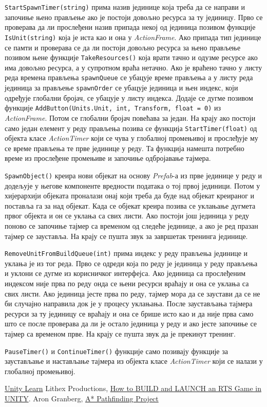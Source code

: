 \documentclass[11pt,a4paper]{article}
\begin{document}
\texttt{StartSpawnTimer(string)} прима назив јединице која треба да се направи и започиње њено прављење ако је постоји довољно ресурса за ту јединицу. Прво се проверава да ли прослеђени назив припада некој од јединица позивом функције \texttt{IsUnit(string)} која је иста као и она у \emph{ActionFrame}. Ако припада тип јединице се памти и проверава се да ли постоји довољно ресурса за њено прављење позивом њене функције \texttt{TakeResources()} која врати тачно и одузме ресурсе ако има довољно ресурса, а у супротном враћа нетачно. Ако је враћено тачно у листу реда времена прављења \texttt{spawnQueue} се убацује време прављења а у листу реда јединица за прављење \texttt{spawnOrder} се убацује јединица и њен индекс, који одређује глобални бројач, се убацује у листу индекса. Додаје се дугме позивом функције \texttt{AddButton(Units.Unit, int, Transform, float = 0)} из \emph{ActionFrame}. Потом се глобални бројач повећава за један. На крају ако постоји само један елемент у реду прављења позива се функција \texttt{StartTimer(float)} од објекта класе \emph{ActionTimer} који се чува у глобалној промењивој и прослеђује му се време прављења те прве јединице у реду. Та функција намешта потребно време из прослеђене промењиве и започиње одбројавање тајмера.

\texttt{SpawnObject()}  креира нови објекат на основу \emph{Prefab}-а из прве јединице у реду и додељује у његове компоненте вредности података о тој првој јединици. Потом у хијерархији објеката проналази онај који треба да буде над објекат креираног и поставља га за над објекат. Када се објекат креира позива се уклањање дугмета првог објекта и он се уклања са свих листи. Ако постоји још јединица у реду поново се започиње тајмер са временом од следеће јединице, а ако је ред празан тајмер се зауставља. На крају се пушта звук за завршетак тренинга јединице.

\texttt{RemoveUnitFromBuildQueue(int)} прима индекс у реду прављења јединице и уклања је из тог реда. Прво се одреди која по реду је јединица у реду прављења и уклони се дугме из корисничког интерфејса. Ако јединица са прослеђеним индексом није прва по реду онда се њени ресурси враћају и она се уклања са свих листи. Ако јединица јесте прва по реду, тајмер мора да се заустави да се не би случајно направила док је у процесу уклањања. После заустављања тајмера ресурси за ту јединицу се враћају и она се брише исто као и да није прва само што се после проверава да ли је остало јединица у реду и ако јесте започиње се тајмер са временом прве. На крају се пушта звук да је прекинут тренинг.

\texttt{PauseTimer()} и \texttt{ContinueTimer()} функције само позивају функције за заустављање и настављање тајмера из објекта класе \emph{ActionTimer} који се налази у глобалној промењивој. 

\newpage
\begin{thebibliography}{9}
\href{https://learn.unity.com/}{Unity Learn}
   Lithex Productions, \href{https://www.youtube.com/watch?v=oVM_ugro6Mw&list=PLQPhaRCbpx5U0kcamApy727XC0v1bF0PK&index=1}{How to BUILD and LAUNCH an RTS Game in UNITY}.
Aron Granberg, \href{https://arongranberg.com/astar/front}{A* Pathfinding Project}
\end{thebibliography}
\end{document}
